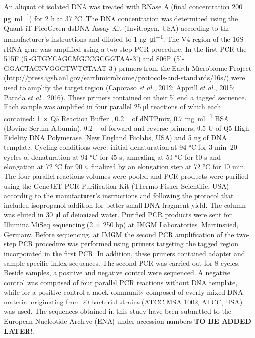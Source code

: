 \documentclass[12pt,]{article}
\begin{document}
An aliquot of isolated DNA was treated with RNase A (final concentration
200 \si{\ug\per\ml}) for 2 \si{\hour} at 37 \si{\degreeCelsius}. The DNA
concentration was determined using the Quant-iT PicoGreen dsDNA Assay
Kit (Invitrogen, USA) according to the manufacturer's instructions and
diluted to 1 \si{\ng\per\ul}. The V4 region of the 16S rRNA gene was
amplified using a two-step PCR procedure. In the first PCR the 515F
(5'-GTGYCAGCMGCCGCGGTAA-3') and 806R (5'-GGACTACNVGGGTWTCTAAT-3')
primers from the Earth Microbiome Project
(\url{http://press.igsb.anl.gov/earthmicrobiome/protocols-and-standards/16s/})
were used to amplify the target region (Caporaso \emph{et al.}, 2012;
Apprill \emph{et al.}, 2015; Parada \emph{et al.}, 2016). These primers
contained on their 5' end a tagged sequence. Each sample was amplified
in four parallel 25 \si{\ul} reactions of which each contained: 1 × Q5
Reaction Buffer , 0.2 \si{\milli\Molar} of dNTPmix, 0.7 \si{\mg\per\ml}
BSA (Bovine Serum Albumin), 0.2 \si{\micro\Molar} of forward and reverse
primers, 0.5 U of Q5 High-Fidelity DNA Polymerase (New England Biolabs,
USA) and 5 \si{\ng} of DNA template. Cycling conditions were: initial
denaturation at 94 \si{\degreeCelsius} for 3 \si{\minute}, 20 cycles of
denaturation at 94 \si{\degreeCelsius} for 45 \si{\s}, annealing at 50
\si{\degreeCelsius} for 60 \si{\s} and elongation at 72
\si{\degreeCelsius} for 90 \si{\s}, finalized by an elongation step at
72 \si{\degreeCelsius} for 10 \si{\minute}. The four parallel reactions
volumes were pooled and PCR products were purified using the GeneJET PCR
Purification Kit (Thermo Fisher Scientific, USA) according to the
manufacturer's instructions and following the protocol that included
isopropanol addition for better small DNA fragment yield. The column was
eluted in 30 \si{\ul} of deionized water. Purified PCR products were
sent for Illumina MiSeq sequencing (2 × 250 bp) at IMGM Laboratories,
Martinsried, Germany. Before sequencing, at IMGM the second PCR
amplification of the two-step PCR procedure was performed using primers
targeting the tagged region incorporated in the first PCR. In addition,
these primers contained adapter and sample-specific index sequences. The
second PCR was carried out for 8 cycles. Beside samples, a positive and
negative control were sequenced. A negative control was comprised of
four parallel PCR reactions without DNA template, while for a positive
control a mock community composed of evenly mixed DNA material
originating from 20 bacterial strains (ATCC MSA-1002, ATCC, USA) was
used. The sequences obtained in this study have been submitted to the
European Nucleotide Archive (ENA) under accession numbers \textbf{TO BE
ADDED LATER!}.
\end{document}
